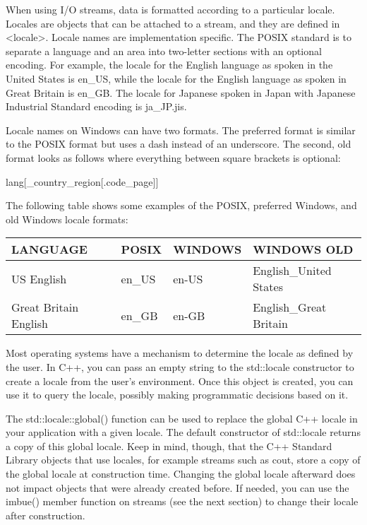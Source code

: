
When using I/O streams, data is formatted according to a particular locale. Locales are objects that can be attached to a stream, and they are defined in <locale>. Locale names are implementation specific. The POSIX standard is to separate a language and an area into two-letter sections with an optional encoding. For example, the locale for the English language as spoken in the United States is en\_US, while the locale for the English language as spoken in Great Britain is en\_GB. The locale for Japanese spoken in Japan with Japanese Industrial Standard encoding is ja\_JP.jis.

Locale names on Windows can have two formats. The preferred format is similar to the POSIX format but uses a dash instead of an underscore. The second, old format looks as follows where everything between square brackets is optional:

\begin{cpp}
lang[_country_region[.code_page]]
\end{cpp}

The following table shows some examples of the POSIX, preferred Windows, and old Windows locale formats:

\begin{longtable}{|l|l|l|l|}
\hline
\textbf{LANGUAGE}     & \textbf{POSIX} & \textbf{WINDOWS} & \textbf{WINDOWS OLD}   \\ \hline
\endfirsthead
%
\endhead
%
US English            & en\_US         & en-US            & English\_United States \\ \hline
Great Britain English & en\_GB         & en-GB            & English\_Great Britain \\ \hline
\end{longtable}

Most operating systems have a mechanism to determine the locale as defined by the user. In C++, you can pass an empty string to the std::locale constructor to create a locale from the user’s environment. Once this object is created, you can use it to query the locale, possibly making programmatic decisions based on it.


The std::locale::global() function can be used to replace the global C++ locale in your application with a given locale. The default constructor of std::locale returns a copy of this global locale. Keep in mind, though, that the C++ Standard Library objects that use locales, for example streams such as cout, store a copy of the global locale at construction time. Changing the global locale afterward does not impact objects that were already created before. If needed, you can use the imbue() member function on streams (see the next section) to change their locale after construction.

